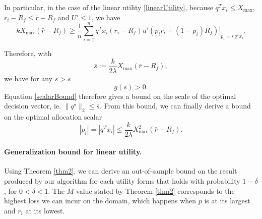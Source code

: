 In particular, in the case of the linear utility \eqref{linearUtility}, because
$q^Tx_i\leq X_{\max}$, $r_i-R_f\leq \bar r - R_f$ and $U'\leq 1$, we have
\begin{equation*}
 k X_{\max}(\bar{r}-R_f) \geq \frac{1}{n} \sum_{i=1}^n q^{T}x_i (r_i-R_f) \left. u'(p_i r_i +
    (1-p_i)R_f) \right|_{p_i = s\,q^{T}x_i}.
\end{equation*}

Therefore, with
\begin{equation}
  \label{scalarBound}
  \bar s := \frac{k}{2\lambda}X_{\max}(\bar r-R_f),
\end{equation}
we have for any $s>\bar s$
\begin{equation*}
  g(s) > 0.
\end{equation*}
Equation \eqref{scalarBound} therefore gives a bound on the scale of the optimal
decision vector, ie. $\|q^\star\|_2 \leq \bar s$. From this bound, we can finally derive a
bound on the optimal allocation scalar
\begin{equation}
  \label{allocationBound}
  |p_i| = |q^{T}x_i|\leq \frac{k}{2\lambda} X^2_{\max}(\bar r -R_f).
\end{equation}

\paragraph{Generalization bound for linear utility.}
Using Theorem \ref{thm2}, we can derive an out-of-sample bound on the result produced by
our algorithm for each utility forms that holds with probability $1-\delta$, for
$0<\delta<1$. The $M$ value stated by Theorem \ref{thm2} corresponds to the highest loss
we can incur on the domain, which happens when $p$ is at its largest and $r_i$ at its
lowest.

